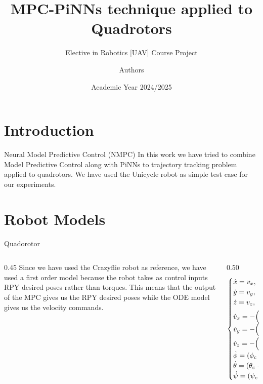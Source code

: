 \documentclass{beamer}
\title{MPC-PiNNs technique applied to Quadrotors}
\subtitle{Elective in Robotics [UAV] Course Project}
\author{{Authors}} %
\date{Academic Year 2024/2025}
\begin{document}
\maketitle
\section{Introduction}
\begin{frame}{Neural Model Predictive Control (NMPC)}
    In this work we have tried to combine Model Predictive Control along with PiNNs to trajectory tracking problem applied to quadrotors. We have used the Unicycle robot as simple test case for our experiments.
\end{frame}
\section{Robot Models}

\begin{frame}{Quadorotor}
    \begin{columns}[T] %
        \begin{column}{0.45\textwidth}
            \vspace{0.7cm}
            Since we have used the Crazyflie robot as reference, we have used a first order model because the robot takes as control inputs RPY desired poses rather than torques. This means that the output of the MPC gives us the RPY desired poses while the ODE model gives us the velocity commands.
        \end{column}
        
        \begin{column}{0.50\textwidth}
            \vspace{-1.0cm}
            \begin{align}
                \begin{cases}
                    \dot{x} = v_{x}, \\
                    \dot{y} = v_{y}, \\
                    \dot{z} = v_{z}, \\[1ex]
                    \dot{v}_{x} = -\Bigl(\cos\psi\, \sin\theta\, \cos\phi + \sin\psi\, \sin\phi\Bigr)\frac{T}{m}, \\
                    \dot{v}_{y} = -\Bigl(\sin\psi\, \sin\theta\, \cos\phi - \cos\psi\, \sin\phi\Bigr)\frac{T}{m}, \\
                    \dot{v}_{z} = -\Bigl(\cos\theta\, \cos\phi\Bigr)\dfrac{T}{m} + g, \\
                    \dot{\phi} = ({\phi_{c} - \phi})/{\tau} \\
                    \dot{\theta} = ({\theta_{c} - \theta})/{\tau} \\
                    \dot{\psi} = ({\psi_{c} - \psi})/{\tau} 
                \end{cases}
            \end{align}
        \end{column}
    \end{columns}
\end{frame}
\end{document}
